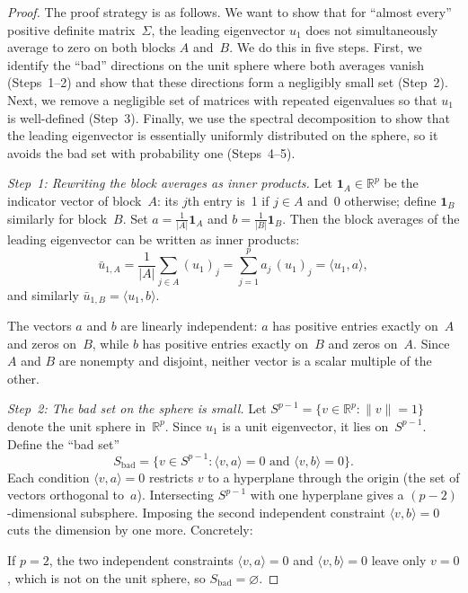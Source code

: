 \documentclass[hidelinks]{siamart251216}
\newcommand{\R}{\mathbb{R}}
\begin{document}
\begin{proof}
  The proof strategy is as follows.  We want to show that for ``almost
  every'' positive definite matrix~$\Sigma$, the leading eigenvector
  $u_1$ does not simultaneously average to zero on both blocks $A$
  and~$B$.  We do this in five steps.  First, we identify the ``bad'' directions on
  the unit sphere where both averages vanish (Steps~1--2) and show that
  these directions form a negligibly small set (Step~2).  Next, we remove
  a negligible set of matrices with repeated eigenvalues so that $u_1$ is
  well-defined (Step~3).  Finally, we use the spectral decomposition to
  show that the leading eigenvector is essentially uniformly distributed
  on the sphere, so it avoids the bad set with probability one
  (Steps~4--5).

  \emph{Step~1: Rewriting the block averages as inner products.}
  Let $\mathbf{1}_A \in \R^p$ be the indicator vector of block~$A$:
  its $j$th entry is~1 if $j \in A$ and~0 otherwise; define
  $\mathbf{1}_B$ similarly for block~$B$.  Set
  $a = \frac{1}{|A|}\mathbf{1}_A$ and
  $b = \frac{1}{|B|}\mathbf{1}_B$.  Then the block averages of the
  leading eigenvector can be written as inner products:
  \[
    \bar{u}_{1,A}
    = \frac{1}{|A|}\sum_{j \in A} (u_1)_j
    = \sum_{j=1}^p a_j\, (u_1)_j
    = \langle u_1, a \rangle,
  \]
  and similarly $\bar{u}_{1,B} = \langle u_1, b \rangle$.

  The vectors $a$ and $b$ are linearly independent: $a$ has positive
  entries exactly on~$A$ and zeros on~$B$, while $b$ has positive
  entries exactly on~$B$ and zeros on~$A$.  Since $A$ and $B$ are
  nonempty and disjoint, neither vector is a scalar multiple of the
  other.

  \emph{Step~2: The bad set on the sphere is small.}
  Let $S^{p-1} = \{v \in \R^p : \|v\| = 1\}$ denote the unit sphere
  in~$\R^p$.  Since $u_1$ is a unit eigenvector, it lies on~$S^{p-1}$.
  Define the ``bad set''
  \[
    S_{\mathrm{bad}}
    = \{ v \in S^{p-1} : \langle v, a \rangle = 0
    \text{ and } \langle v, b \rangle = 0 \}.
  \]
  Each condition $\langle v, a \rangle = 0$ restricts $v$ to a
  hyperplane through the origin (the set of vectors orthogonal to~$a$).
  Intersecting $S^{p-1}$ with one hyperplane gives a
  $(p-2)$-dimensional subsphere.  Imposing the second independent
  constraint $\langle v, b \rangle = 0$ cuts the dimension by one more.
  Concretely:

  If $p = 2$, the two independent constraints $\langle v, a \rangle = 0$
  and $\langle v, b \rangle = 0$ leave only $v = 0$, which is not on
  the unit sphere, so $S_{\mathrm{bad}} = \varnothing$.


\end{proof}
\end{document}
